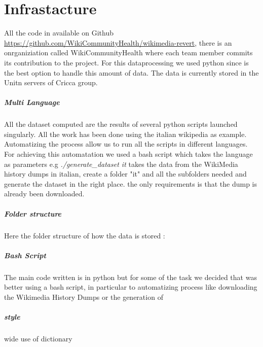 \chapter{Infrastacture}
All the code in available on Github \url{https://github.com/WikiCommunityHealth/wikimedia-revert},
there is an onrganiziation called WikiCommunityHealth where each team member commits its
contribution to the project. For this dataprocessing we used python since is the best option to
handle this amount of data. The data is currently stored in the Unitn servers of Cricca group.

\paragraph*{Multi Language}
All the dataset computed are the results of several python scripts launched singularly. All the work
has been done using the italian wikipedia as example. Automatizing the process allow us to run all
the scripts in different languages. For achieving this automatation we used a bash script which
takes the language as parameters e.g \textit{./generate\_dataset it} takes the data from the WikiMedia history
dumps in italian, create a folder "it" and all the subfolders needed and generate the dataset in the
right place. the only requirements is that the dump is already been downloaded. 

\paragraph*{Folder structure}
Here the folder structure of how the data is stored :  


\paragraph*{Bash Script}
The main code written is in python but for some of the task we decided that was better using a bash
script, in particular to automatizing process like downloading the Wikimedia History Dumps or the generation of 



\paragraph{style}
wide use of dictionary 